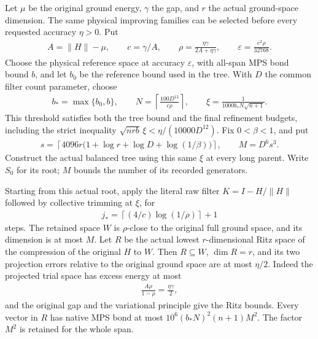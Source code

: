\documentclass{article}
\begin{document}
Let $\mu$ be the original ground energy, $\gamma$ the gap, and $r$ the
actual ground-space dimension. The same physical improving families can
be selected before every requested accuracy $\eta>0$. Put
\begin{align}
    A=\|H\|-\mu,\qquad c=\gamma/A,\qquad
    \rho=\frac{\eta\gamma}{2A+\eta\gamma},\qquad
    \varepsilon=\frac{c^2\rho}{32768}.
    \label{eq:alvv_approximation_refinement_accuracy_parameters}
\end{align}
Choose the physical reference space at accuracy $\varepsilon$, with
all-span MPS bond bound $b$, and let $b_0$ be the reference bound used in
the tree. With $D$ the common filter count parameter, choose
\begin{align}
    b_* =\max\{b_0,b\},\qquad
    N=\left\lceil\frac{100D^{12}}{c\rho}\right\rceil,\qquad
    \xi=\frac1{1000b_*N\sqrt{n+1}}.
    \label{eq:alvv_approximation_refinement_threshold_parameters}
\end{align}
This threshold satisfies both the tree bound and the final refinement
budgets, including the strict inequality
$\sqrt{nrb}\,\xi<\eta/(10000D^{12})$.
Fix $0<\beta<1$, and put
\begin{align}
    s=\left\lceil4096r\bigl(1+\log r+\log D+\log(1/\beta)\bigr)\right\rceil,
    \qquad M=D^6s^3.
    \label{eq:alvv_approximation_refinement_sample_parameters}
\end{align}
Construct the actual balanced tree using this same $\xi$ at every long
parent. Write $S_0$ for its root; $M$ bounds the number of its recorded
generators.

Starting from this actual root, apply the literal raw filter
$K=I-H/\|H\|$ followed by collective trimming at $\xi$, for
\begin{align}
    j_* =\left\lceil(4/c)\log(1/\rho)\right\rceil+1
    \label{eq:alvv_approximation_refinement_step_count}
\end{align}
steps. The retained space $W$ is $\rho$-close to the original full ground
space, and its dimension is at most $M$. Let $R$ be the actual lowest
$r$-dimensional Ritz space of the compression of the original $H$ to
$W$. Then $R\subseteq W$, $\dim R=r$, and its two projection errors
relative to the original ground space are at most $\eta/2$.
Indeed the projected trial space has excess energy at most
\begin{align}
    \frac{A\rho}{1-\rho}=\frac{\eta\gamma}{2},
    \label{eq:alvv_approximation_trial_energy_excess}
\end{align}
and the original gap and the variational principle give the Ritz bounds.
Every vector in $R$ has native MPS bond at most
$10^6(b_*N)^2(n+1)M^2$. The factor $M^2$ is retained for the whole span.
\end{document}
